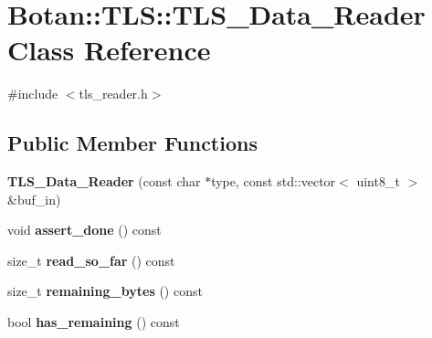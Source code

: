 \hypertarget{class_botan_1_1_t_l_s_1_1_t_l_s___data___reader}{}\section{Botan\+:\+:T\+LS\+:\+:T\+L\+S\+\_\+\+Data\+\_\+\+Reader Class Reference}
\label{class_botan_1_1_t_l_s_1_1_t_l_s___data___reader}


{\ttfamily \#include $<$tls\+\_\+reader.\+h$>$}

\subsection*{Public Member Functions}
\begin{DoxyCompactItemize}
\item 
\mbox{\label{class_botan_1_1_t_l_s_1_1_t_l_s___data___reader_a9a39a0e225912c3c2b676ddcf3630a9b}} 
{\bfseries T\+L\+S\+\_\+\+Data\+\_\+\+Reader} (const char $\ast$type, const std\+::vector$<$ uint8\+\_\+t $>$ \&buf\+\_\+in)
\item 
\mbox{\label{class_botan_1_1_t_l_s_1_1_t_l_s___data___reader_a200dcd6721bb003af2d24c0919bbad74}} 
void {\bfseries assert\+\_\+done} () const
\item 
\mbox{\label{class_botan_1_1_t_l_s_1_1_t_l_s___data___reader_a2232ef0e996b3cff45c55eaf90318b6a}} 
size\+\_\+t {\bfseries read\+\_\+so\+\_\+far} () const
\item 
\mbox{\label{class_botan_1_1_t_l_s_1_1_t_l_s___data___reader_ab9f22811f622f912127369ebd7931468}} 
size\+\_\+t {\bfseries remaining\+\_\+bytes} () const
\item 
\mbox{\label{class_botan_1_1_t_l_s_1_1_t_l_s___data___reader_a0a59f90738241c63d689e061e0a53f62}} 
bool {\bfseries has\+\_\+remaining} () const
\item 
\mbox{\label{class_botan_1_1_t_l_s_1_1_t_l_s___data___reader_a61f8aa6665ea83874fb98a3ba6234b4b}} 

\end{DoxyCompactItemize}

